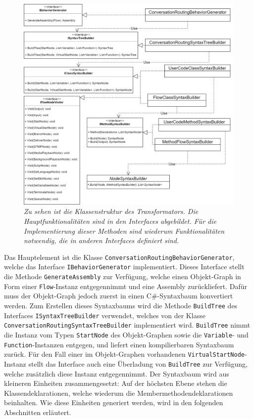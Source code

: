 \begin{figure} %
	\centering
		\includegraphics[width=\textwidth]{img/TransformatorUML.png}
	\caption[Klassenstruktur des Transformators]{\textit{Zu sehen ist die Klassenstruktur des Transformators. Die Hauptfunktionalitäten sind in den Interfaces abgebildet. Für die Implementierung dieser Methoden sind wiederum Funktionalitäten notwendig, die in anderen Interfaces definiert sind.}}
	\label{fig:UML:Transformator}
\end{figure}
\noindent Das Hauptelement ist die Klasse \texttt{ConversationRoutingBehaviorGenerator}, welche das Interface \texttt{IBehaviorGenerator} implementiert. Dieses Interface stellt die Methode \texttt{GenerateAssembly} zur Verfügung, welche einen Objekt-Graph in Form einer \texttt{Flow}-Instanz entgegennimmt und eine Assembly zurückliefert.  Dafür muss der Objekt-Graph jedoch zuerst in einen C\#-Syntaxbaum konvertiert werden. 
\newpage
\noindent Zum Erstellen dieses Syntaxbaums wird die Methode \texttt{BuildTree} des Interfaces \texttt{ISyntaxTreeBuilder} verwendet, welches von der Klasse \texttt{Con\-ver\-sa\-tion\-Rou\-ting\-Syn\-tax\-Tree\-Buil\-der} implementiert wird. \texttt{BuildTree} nimmt die Instanz vom Typen \texttt{StartNode} des Objekt-Graphen sowie die \texttt{Variable}- und \texttt{Function}-Instanzen entgegen, und liefert einen kompilierbaren Syntaxbaum zurück. Für den Fall einer im Objekt-Graphen vorhandenen \texttt{Vir\-tu\-al\-Start\-Node}-Instanz stellt das Interface auch eine Überladung von \texttt{Build\-Tree} zur Verfügung, welche zusätzlich diese Instanz entgegennimmt. Der Syntaxbaum wird aus kleineren Einheiten zusammengesetzt: Auf der höchsten Ebene stehen die Klassendeklarationen, welche wiederum die Membermethodendeklarationen beinhalten. Wie diese Einheiten generiert werden, wird in den folgenden Abschnitten erläutert.

